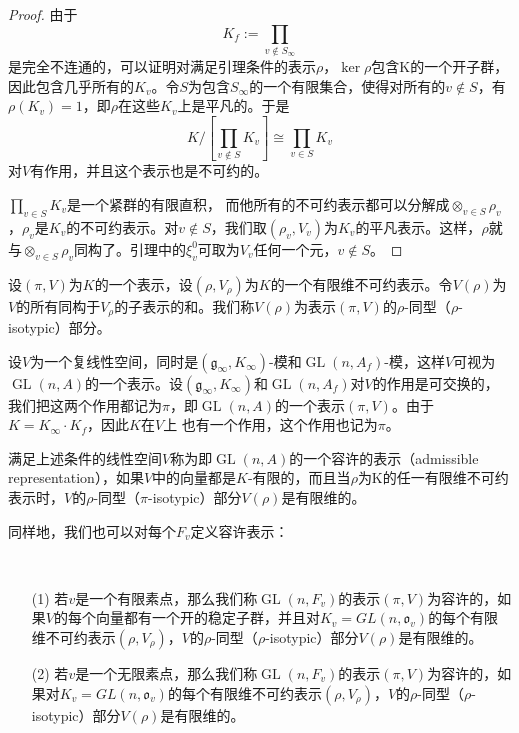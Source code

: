 \begin{proof}
由于
$$K_f := \prod\limits_{v \not \in S_\infty}$$
是完全不连通的，可以证明对满足引理条件的表示$\rho$，$\ker \rho$包含K的一个开子群，因此包含几乎所有的$K_v$。令$S$为包含$S_\infty$的一个有限集合，使得对所有的$v \not \in S$，有$\rho(K_v)=1$，即$\rho$在这些$K_v$上是平凡的。于是
$$K / [ \prod\limits_{v \not\in S} K_v ] \cong \prod\limits_{v \in S} K_v $$
对$V$有作用，并且这个表示也是不可约的。

$\prod\limits_{v \in S} K_v$是一个紧群的有限直积， 而他所有的不可约表示都可以分解成$\otimes_{v\in S}\rho_v$，$\rho_v$是$K_v$的不可约表示。对$v\not\in S$，我们取$(\rho_v, V_v)$为$K_v$的平凡表示。这样，$\rho$就与$\otimes_{v\in S}\rho_v$同构了。引理中的$\xi_v^0$可取为$V_v$任何一个元，$v \not\in S$。
\end{proof}

\begin{definition}
设$(\pi, V)$为$K$的一个表示，设$(\rho, V_\rho)$为$K$的一个有限维不可约表示。令$V(\rho)$为$V$的所有同构于$V_\rho$的子表示的和。我们称$V(\rho)$为表示$(\pi, V)$的$\rho$-同型（$\rho$-
isotypic）部分。
\end{definition}

设$V$为一个复线性空间，同时是$(\mathfrak{g}_\infty, K_\infty)$-模和$\operatorname{GL}(n,A_f)$-模，这样$V$可视为$\operatorname{GL}(n,A)$的一个表示。设$(\mathfrak{g}_\infty, K_\infty)$和$\operatorname{GL}(n,A_f)$对$V$的作用是可交换的，我们把这两个作用都记为$\pi$，即$\operatorname{GL}(n,A)$的一个表示$(\pi, V)$。由于$K = K_\infty\cdot K_f$，因此$K$在$V$上
也有一个作用，这个作用也记为$\pi$。

\begin{definition}
满足上述条件的线性空间$V$称为即$\operatorname{GL}(n,A)$的一个容许的表示（admissible representation），如果$V$中的向量都是$K$-有限的，而且当$\rho$为K的任一有限维不可约表示时，$V$的$\rho$-同型（$\pi$-isotypic）部分$V(\rho)$是有限维的。
\end{definition}

同样地，我们也可以对每个$F_v$定义容许表示：

\begin{definition}\ 
\begin{itemize}
\item[(1)] 若$v$是一个有限素点，那么我们称$\operatorname{GL}(n,F_v)$的表示$(\pi, V)$为容许的，如果$V$的每个向量都有一个开的稳定子群，并且对$K_v = GL(n, \mathfrak{o}_v)$的每个有限维不可约表示$(\rho, V_\rho)$，$V$的$\rho$-同型（$\rho$-isotypic）部分$V(\rho)$是有限维的。
\item[(2)] 若$v$是一个无限素点，那么我们称$\operatorname{GL}(n,F_v)$的表示$(\pi, V)$为容许的，如果对$K_v = GL(n, \mathfrak{o}_v)$的每个有限维不可约表示$(\rho, V_\rho)$，$V$的$\rho$-同型（$\rho$-isotypic）部分$V(\rho)$是有限维的。
\end{itemize}
\end{definition}

